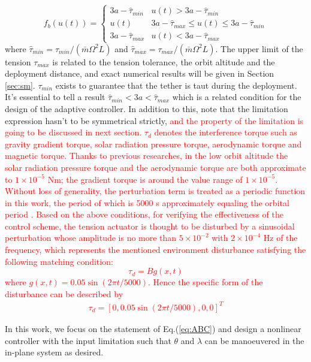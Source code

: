 \documentclass[3p]{elsarticle}
\theoremstyle{plain}
\begin{document}
\begin{equation}
f_b(u(t)) =\begin{cases}
3a-\hat{\tau}_{min}   & u(t) > 3a-\hat{\tau}_{min}\\
u(t)           & 3a - \hat{\tau}_{max} \le u(t) \le 3a-\hat{\tau}_{min}\\
3a-\hat{\tau}_{max}   & u(t) < 3a - \hat{\tau}_{max}
\end{cases}\label{eq:f_b}
\end{equation}
where $\hat{\tau}_{min} = \tau_{min}/(\bar{m}\Omega^2L)$ and $\hat{\tau}_{max} = \tau_{max}/(\bar{m}\Omega^2L)$. The upper limit of the tension $\tau_{max} $ is related to the tension tolerance, the orbit altitude and the deployment distance, and exact numerical results will be given in Section \ref{sec:sm}. $\tau_{min}$ exists to guarantee that the tether is taut during the deployment. It's essential to tell a result $\hat\tau_{min}<3a<\hat\tau_{max}$ which is a related condition for the design of the adaptive controller. In addition to this, note that the limitation expression hasn't to be symmetrical strictly, \textcolor{red}{and the property of the limitation is going to be discussed in next section.} \textcolor{red}{$\tau_d$ denotes the interference torque such as gravity gradient torque, solar radiation pressure torque, aerodynamic torque and magnetic torque. Thanks to previous researches, in the low orbit altitude the solar radiation pressure torque and the aerodynamic torque are both approximate to $1\times 10^{-5}$ Nm; the gradient torque is around the value range of $1\times 10^{-5}$. Without loss of generality, the perturbation term is treated as a periodic function in this work, the period of which is 5000 s approximately equaling the orbital period \cite{liu2013calculation,inamori2015magnetic}. Based on the above conditions, for verifying the effectiveness of the control scheme, the tension actuator is thought to be disturbed by a sinusoidal perturbation whose amplitude is no more than $5\times 10^{-2}$ with $2\times 10^{-4}$ Hz of the frequency, which represents the mentioned environment disturbance satisfying the following matching condition:
\begin{equation}
\tau_d=Bg(x,t)
\end{equation}
where $g(x,t) = 0.05\sin(2\pi t /5000)$. Hence the specific form of the disturbance can be described by
\begin{align}
\tau_d = [0,0.05\sin (2\pi t /5000),0,0]^T\label{eq:disturbance}
\end{align}}\par
In this work, we focus on the statement of Eq.(\ref{eq:ABC}) and design a nonlinear controller with the input limitation such that $\theta$ and $\lambda$ can be manoeuvered in the in-plane system as desired.
\end{document}
